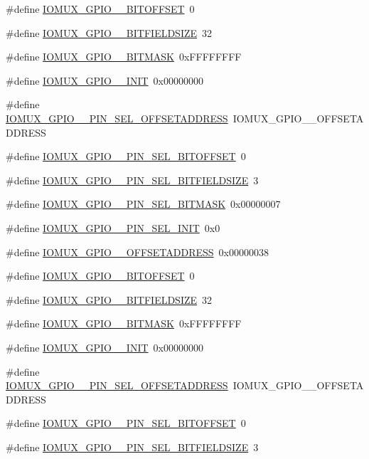 \begin{DoxyCompactItemize}
\#define \hyperlink{a00560_a7568739ef06d67c2715f798562ba3d4f}{IOMUX\_\-GPIO\_\_\-BITOFFSET}~0
\item 
\#define \hyperlink{a00560_a46a347a70119ae875a43643906f82b38}{IOMUX\_\-GPIO\_\_\-BITFIELDSIZE}~32
\item 
\#define \hyperlink{a00560_af90d1ea55d46bafb9931f0713c66e077}{IOMUX\_\-GPIO\_\_\-BITMASK}~0xFFFFFFFF
\item 
\#define \hyperlink{a00560_a7e01c215de891d5bf03227189745f2f8}{IOMUX\_\-GPIO\_\_\-INIT}~0x00000000
\item 
\#define \hyperlink{a00560_a1883134d7b0b9a96f5cee08578dd95cc}{IOMUX\_\-GPIO\_\_\-PIN\_\-SEL\_\-OFFSETADDRESS}~IOMUX\_\-GPIO\_\_\-OFFSETADDRESS
\item 
\#define \hyperlink{a00560_adbc5d52678b025fbafe5a2d43020084d}{IOMUX\_\-GPIO\_\_\-PIN\_\-SEL\_\-BITOFFSET}~0
\item 
\#define \hyperlink{a00560_a52be71531d406a57a47746d046417748}{IOMUX\_\-GPIO\_\_\-PIN\_\-SEL\_\-BITFIELDSIZE}~3
\item 
\#define \hyperlink{a00560_a3ee896d53a5d70bfaaac11d5d48f276b}{IOMUX\_\-GPIO\_\_\-PIN\_\-SEL\_\-BITMASK}~0x00000007
\item 
\#define \hyperlink{a00560_a339346a8bbb5760cc9290fa11f9dfbc8}{IOMUX\_\-GPIO\_\_\-PIN\_\-SEL\_\-INIT}~0x0
\item 
\#define \hyperlink{a00560_a2b63fed49cb79345ac8011d6286f4c6e}{IOMUX\_\-GPIO\_\_\-OFFSETADDRESS}~0x00000038
\item 
\#define \hyperlink{a00560_a04b4cb177b16f17409ddbff539f78167}{IOMUX\_\-GPIO\_\_\-BITOFFSET}~0
\item 
\#define \hyperlink{a00560_a826bc1f4edcf66f14600398bb3e015b8}{IOMUX\_\-GPIO\_\_\-BITFIELDSIZE}~32
\item 
\#define \hyperlink{a00560_a3203973cf404fbb88d68f051eb557ec0}{IOMUX\_\-GPIO\_\_\-BITMASK}~0xFFFFFFFF
\item 
\#define \hyperlink{a00560_a69c50973ceda178ca2e4b04957e8cb7f}{IOMUX\_\-GPIO\_\_\-INIT}~0x00000000
\item 
\#define \hyperlink{a00560_a24f7ca808b10e0108bc7407ef2046cf1}{IOMUX\_\-GPIO\_\_\-PIN\_\-SEL\_\-OFFSETADDRESS}~IOMUX\_\-GPIO\_\_\-OFFSETADDRESS
\item 
\#define \hyperlink{a00560_ad82f57610489f2d90e20fd44d794b3d4}{IOMUX\_\-GPIO\_\_\-PIN\_\-SEL\_\-BITOFFSET}~0
\item 
\#define \hyperlink{a00560_a28ec8c859a7fb9f981f2c98050b91180}{IOMUX\_\-GPIO\_\_\-PIN\_\-SEL\_\-BITFIELDSIZE}~3

\end{DoxyCompactItemize}

